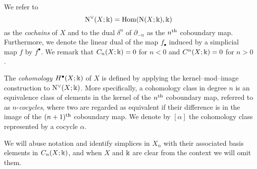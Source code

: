 We refer to
\begin{equation*}
\operatorname{N^{\vee}}(X; \Bbbk) = \mathrm{Hom}(\operatorname{N}(X; \Bbbk), \Bbbk)
\end{equation*}
as the \textit{cochains} of $X$ and to the dual $\delta^{n}$ of $\partial_{-n}$ as the $n^{\mathrm{th}}$ coboundary map.
Furthermore, we denote the linear dual of the map $f_\bullet$ induced by a simplicial map $f$ by $f^\bullet$.
We remark that $C_n(X; \Bbbk) = 0$ for $n < 0$ and $C^n(X;\Bbbk) = 0$ for $n > 0$.

The \textit{cohomology} $H^\bullet(X; \Bbbk)$ of $X$ is defined by applying the kernel--mod--image construction to $\operatorname{N^{\vee}}(X; \Bbbk)$.
More specifically, a cohomology class in degree $n$ is an equivalence class of elements in the kernel of the $n^{\mathrm{th}}$ coboundary map, referred to as $n$-\textit{cocycles}, where two are regarded as equivalent if their difference is in the image of the $(n+1)^{\mathrm{th}}$ coboundary map.
We denote by $[\alpha]$ the cohomology class represented by a cocycle $\alpha$.

We will abuse notation and identify simplices in $X_n$ with their associated basis elements in $C_{n}(X; \Bbbk)$, and when $X$ and $\Bbbk$ are clear from the context we will omit them.